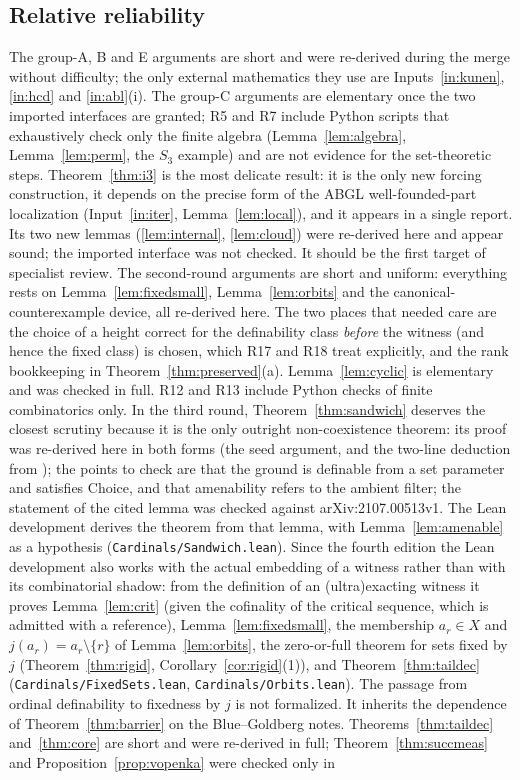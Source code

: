 \documentclass[11pt,letterpaper]{article}
\theoremstyle{definition}
\numberwithin{equation}{section}
\newcommand{\R}[1]{\textsf{R#1}}
\begin{document}
\subsection{Relative reliability}

The group-A, B and E arguments are short and were re-derived during the merge without difficulty; the only external mathematics they use are Inputs~\ref{in:kunen}, \ref{in:hcd} and \ref{in:abl}(i). The group-C arguments are elementary once the two imported interfaces are granted; \R5 and \R7 include Python scripts that exhaustively check only the finite algebra (Lemma~\ref{lem:algebra}, Lemma~\ref{lem:perm}, the $S_3$ example) and are not evidence for the set-theoretic steps. Theorem~\ref{thm:i3} is the most delicate result: it is the only new forcing construction, it depends on the precise form of the ABGL well-founded-part localization (Input~\ref{in:iter}, Lemma~\ref{lem:local}), and it appears in a single report. Its two new lemmas (\ref{lem:internal}, \ref{lem:cloud}) were re-derived here and appear sound; the imported interface was not checked. It should be the first target of specialist review. The second-round arguments are short and uniform: everything rests on Lemma~\ref{lem:fixedsmall}, Lemma~\ref{lem:orbits} and the canonical-counterexample device, all re-derived here. The two places that needed care are the choice of a height correct for the definability class \emph{before} the witness (and hence the fixed class) is chosen, which \R{17} and \R{18} treat explicitly, and the rank bookkeeping in Theorem~\ref{thm:preserved}(a). Lemma~\ref{lem:cyclic} is elementary and was checked in full. \R{12} and \R{13} include Python checks of finite combinatorics only. In the third round, Theorem~\ref{thm:sandwich} deserves the closest scrutiny because it is the only outright non-coexistence theorem: its proof was re-derived here in both forms (the seed argument, and the two-line deduction from \cite[Lemma~2.7]{dichotomy}); the points to check are that the ground is definable from a set parameter and satisfies Choice, and that amenability refers to the ambient filter; the statement of the cited lemma was checked against arXiv:2107.00513v1. The Lean development derives the theorem from that lemma, with Lemma~\ref{lem:amenable} as a hypothesis (\nolinkurl{Cardinals/Sandwich.lean}). Since the fourth edition the Lean development also works with the actual embedding of a witness rather than with its combinatorial shadow: from the definition of an (ultra)exacting witness it proves Lemma~\ref{lem:crit} (given the cofinality of the critical sequence, which is admitted with a reference), Lemma~\ref{lem:fixedsmall}, the membership $a_r\in X$ and $j(a_r)=a_r\setminus\{r\}$ of Lemma~\ref{lem:orbits}, the zero-or-full theorem for sets fixed by $j$ (Theorem~\ref{thm:rigid}, Corollary~\ref{cor:rigid}(1)), and Theorem~\ref{thm:taildec} (\nolinkurl{Cardinals/FixedSets.lean}, \nolinkurl{Cardinals/Orbits.lean}). The passage from ordinal definability to fixedness by $j$ is not formalized. It inherits the dependence of Theorem~\ref{thm:barrier} on the Blue--Goldberg notes. Theorems~\ref{thm:taildec} and~\ref{thm:core} are short and were re-derived in full; Theorem~\ref{thm:succmeas} and Proposition~\ref{prop:vopenka} were checked only in 
\end{document}
